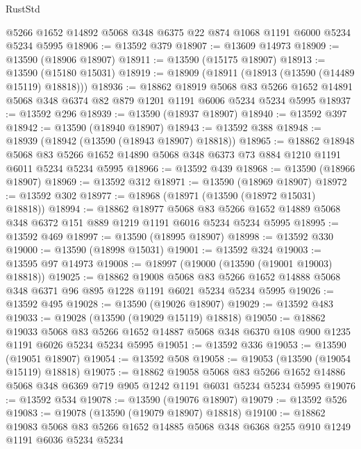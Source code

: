 \begin{lexlean}{RustStd}
\begin{coremodule}
    @5266
    @1652
    @14892
    @5068
    @348
    @6375
    @22
    @874
    @1068
    @1191
    @6000
    @5234
    @5234
    @5995
@18906 := @13592 @379
@18907 := @13609 @14973
@18909 := @13590 (@18906 @18907)
@18911 := @13590 (@15175 @18907)
@18913 := @13590 (@15180 @15031)
@18919 := @18909 (@18911 (@18913 (@13590 (@14489 @15119) @18818)))
@18936 := @18862
    @18919
    @5068
    @83
    @5266
    @1652
    @14891
    @5068
    @348
    @6374
    @82
    @879
    @1201
    @1191
    @6006
    @5234
    @5234
    @5995
@18937 := @13592 @296
@18939 := @13590 (@18937 @18907)
@18940 := @13592 @397
@18942 := @13590 (@18940 @18907)
@18943 := @13592 @388
@18948 := @18939 (@18942 (@13590 (@18943 @18907) @18818))
@18965 := @18862
    @18948
    @5068
    @83
    @5266
    @1652
    @14890
    @5068
    @348
    @6373
    @73
    @884
    @1210
    @1191
    @6011
    @5234
    @5234
    @5995
@18966 := @13592 @439
@18968 := @13590 (@18966 @18907)
@18969 := @13592 @312
@18971 := @13590 (@18969 @18907)
@18972 := @13592 @302
@18977 := @18968 (@18971 (@13590 (@18972 @15031) @18818))
@18994 := @18862
    @18977
    @5068
    @83
    @5266
    @1652
    @14889
    @5068
    @348
    @6372
    @151
    @889
    @1219
    @1191
    @6016
    @5234
    @5234
    @5995
@18995 := @13592 @469
@18997 := @13590 (@18995 @18907)
@18998 := @13592 @330
@19000 := @13590 (@18998 @15031)
@19001 := @13592 @324
@19003 := @13595 @97 @14973
@19008 := @18997 (@19000 (@13590 (@19001 @19003) @18818))
@19025 := @18862
    @19008
    @5068
    @83
    @5266
    @1652
    @14888
    @5068
    @348
    @6371
    @96
    @895
    @1228
    @1191
    @6021
    @5234
    @5234
    @5995
@19026 := @13592 @495
@19028 := @13590 (@19026 @18907)
@19029 := @13592 @483
@19033 := @19028 (@13590 (@19029 @15119) @18818)
@19050 := @18862
    @19033
    @5068
    @83
    @5266
    @1652
    @14887
    @5068
    @348
    @6370
    @108
    @900
    @1235
    @1191
    @6026
    @5234
    @5234
    @5995
@19051 := @13592 @336
@19053 := @13590 (@19051 @18907)
@19054 := @13592 @508
@19058 := @19053 (@13590 (@19054 @15119) @18818)
@19075 := @18862
    @19058
    @5068
    @83
    @5266
    @1652
    @14886
    @5068
    @348
    @6369
    @719
    @905
    @1242
    @1191
    @6031
    @5234
    @5234
    @5995
@19076 := @13592 @534
@19078 := @13590 (@19076 @18907)
@19079 := @13592 @526
@19083 := @19078 (@13590 (@19079 @18907) @18818)
@19100 := @18862
    @19083
    @5068
    @83
    @5266
    @1652
    @14885
    @5068
    @348
    @6368
    @255
    @910
    @1249
    @1191
    @6036
    @5234
    @5234

\end{coremodule}
\end{lexlean}
